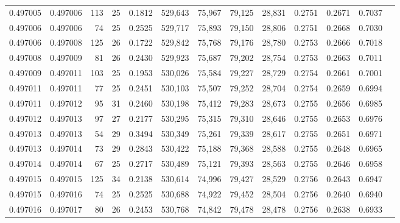 \begin{tabular}{rrrrrrrrrrrrr}
0.497005 & 0.497006 & 113 &  25 &                                     0.1812 & 529,643 &  75,967 &  79,125 &  28,831 & 0.2751 & 0.2671 & 0.7037 \\
0.497006 & 0.497006 &  74 &  25 &                                     0.2525 & 529,717 &  75,893 &  79,150 &  28,806 & 0.2751 & 0.2668 & 0.7030 \\
0.497006 & 0.497008 & 125 &  26 &                                     0.1722 & 529,842 &  75,768 &  79,176 &  28,780 & 0.2753 & 0.2666 & 0.7018 \\
0.497008 & 0.497009 &  81 &  26 &                                     0.2430 & 529,923 &  75,687 &  79,202 &  28,754 & 0.2753 & 0.2663 & 0.7011 \\
0.497009 & 0.497011 & 103 &  25 &                                     0.1953 & 530,026 &  75,584 &  79,227 &  28,729 & 0.2754 & 0.2661 & 0.7001 \\
0.497011 & 0.497011 &  77 &  25 &                                     0.2451 & 530,103 &  75,507 &  79,252 &  28,704 & 0.2754 & 0.2659 & 0.6994 \\
0.497011 & 0.497012 &  95 &  31 &                                     0.2460 & 530,198 &  75,412 &  79,283 &  28,673 & 0.2755 & 0.2656 & 0.6985 \\
0.497012 & 0.497013 &  97 &  27 &                                     0.2177 & 530,295 &  75,315 &  79,310 &  28,646 & 0.2755 & 0.2653 & 0.6976 \\
0.497013 & 0.497013 &  54 &  29 &                                     0.3494 & 530,349 &  75,261 &  79,339 &  28,617 & 0.2755 & 0.2651 & 0.6971 \\
0.497013 & 0.497014 &  73 &  29 &                                     0.2843 & 530,422 &  75,188 &  79,368 &  28,588 & 0.2755 & 0.2648 & 0.6965 \\
0.497014 & 0.497014 &  67 &  25 &                                     0.2717 & 530,489 &  75,121 &  79,393 &  28,563 & 0.2755 & 0.2646 & 0.6958 \\
0.497015 & 0.497015 & 125 &  34 &                                     0.2138 & 530,614 &  74,996 &  79,427 &  28,529 & 0.2756 & 0.2643 & 0.6947 \\
0.497015 & 0.497016 &  74 &  25 &                                     0.2525 & 530,688 &  74,922 &  79,452 &  28,504 & 0.2756 & 0.2640 & 0.6940 \\
0.497016 & 0.497017 &  80 &  26 &                                     0.2453 & 530,768 &  74,842 &  79,478 &  28,478 & 0.2756 & 0.2638 & 0.6933 \\

\end{tabular}
